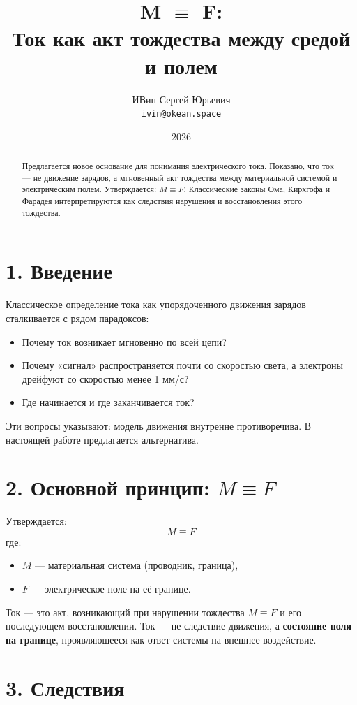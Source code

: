 \documentclass[12pt]{article}
\title{\textbf{M $\mathbf{\equiv}$ F: \\ Ток как акт тождества между средой и полем}}
\author{ИВин Сергей Юрьевич \\ \texttt{ivin@okean.space}}
\date{2026}
\begin{document}
\maketitle

\begin{abstract}
Предлагается новое основание для понимания электрического тока. Показано, что ток — не движение зарядов, а мгновенный акт тождества между материальной системой и электрическим полем. Утверждается: \( M \equiv F \). Классические законы Ома, Кирхгофа и Фарадея интерпретируются как следствия нарушения и восстановления этого тождества.
\end{abstract}

\section*{1. Введение}
Классическое определение тока как упорядоченного движения зарядов сталкивается с рядом парадоксов:
\begin{itemize}
    \item Почему ток возникает мгновенно по всей цепи?
    \item Почему «сигнал» распространяется почти со скоростью света, а электроны дрейфуют со скоростью менее 1 мм/с?
    \item Где начинается и где заканчивается ток?
\end{itemize}
Эти вопросы указывают: модель движения внутренне противоречива. В настоящей работе предлагается альтернатива.

\section*{2. Основной принцип: $ M \equiv F $}
Утверждается:
\[
\boxed{M \equiv F}
\]
где:
\begin{itemize}
    \item $ M $ — материальная система (проводник, граница),
    \item $ F $ — электрическое поле на её границе.
\end{itemize}

Ток — это акт, возникающий при нарушении тождества $ M \equiv F $ и его последующем восстановлении.  
Ток — не следствие движения, а \textbf{состояние поля на границе}, проявляющееся как ответ системы на внешнее воздействие.

\section*{3. Следствия}
\end{document}
